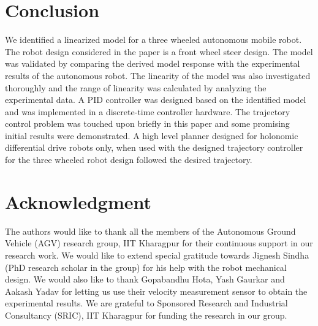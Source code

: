 \documentclass[conference]{IEEEtran}
\begin{document}
\section{Conclusion}
We identified a linearized model for a three wheeled autonomous mobile robot. The robot design considered in the paper is a front wheel steer design. The model was validated by comparing the derived model response with the experimental results of the autonomous robot. The linearity of the model was also investigated thoroughly and the range of linearity was calculated by analyzing the experimental data. A PID controller was designed based on the identified model and was implemented in a discrete-time controller hardware. The trajectory control problem was touched upon briefly in this paper and some promising initial results were demonstrated. A high level planner designed for holonomic differential drive robots only, when used with the designed trajectory controller for the three wheeled robot design followed the desired trajectory.




\section*{Acknowledgment}


The authors would like to thank all the members of the Autonomous Ground Vehicle (AGV) research group, IIT Kharagpur for their continuous support in our research work. We would like to extend special gratitude towards Jignesh Sindha (PhD research scholar in the group) for his help with the robot mechanical design. We would also like to thank Gopabandhu Hota, Yash Gaurkar and Aakash Yadav for letting us use their velocity measurement sensor to obtain the experimental results. We are grateful to Sponsored Research and Industrial Consultancy (SRIC), IIT Kharagpur for funding the research in our group.




%
%
%
\printbibliography


\end{document}
